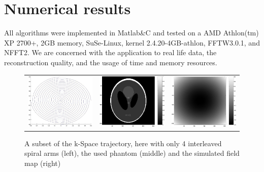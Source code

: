 \documentclass[journal]{IEEEtran}
\numberwithin{equation}{section}
\numberwithin{table}{section}
\numberwithin{figure}{section}
\begin{document}
\section{Numerical results}\label{Sec:Num}
All algorithms were implemented in Matlab\&C and tested on a AMD Athlon(tm) XP
2700+, 2GB memory, SuSe-Linux, kernel 2.4.20-4GB-athlon, FFTW3.0.1, and NFFT2.
We are concerned with the application to real life data, the reconstruction
quality, and the usage of time and memory resources.

\begin{figure}[ht] 
\centering
\begin{tabular}{ccc}
\includegraphics[width=5.5cm]{pics/spiral.jpg} &
\includegraphics[width=5.5cm]{pics/phantom_original.jpg} &
\includegraphics[width=5.5cm]{pics/fieldmap_simulated.jpg}
\end{tabular}
\caption{A subset of the k-Space trajectory, here with only 4 interleaved spiral arms (left), the used phantom (middle) and the simulated field map (right)}
\label{Fig:Phantom}
\end{figure}
\end{document}
